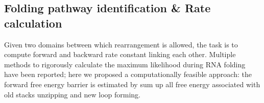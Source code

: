 \documentclass[11pt, a4paper]{article}
\begin{document}
\subsection{Folding pathway identification \& Rate calculation} \label{section:rate}

Given two domains between which rearrangement is allowed, the task is to compute forward and backward rate constant
linking each other. Multiple methods to rigorously calculate the maximum likelihood during RNA folding have been reported;
here we proposed a computationally feasible approach: the forward free energy barrier is estimated by sum up all free energy associated
with old stacks unzipping and new loop forming.




\small
%
%
\end{document}
